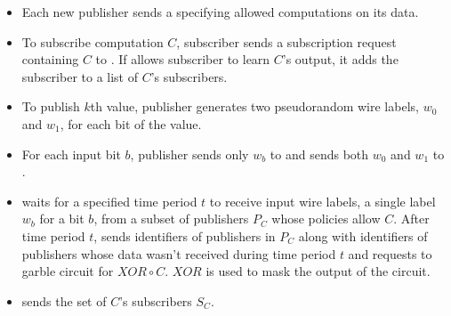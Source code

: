 \begin{figure*}[h]
\begin{mdframed}[style=myframe]

\initialize
\begin{itemize}[leftmargin=18pt,itemsep=4pt,topsep=4pt]
 
	\item Each new publisher sends \broker a \policy specifying allowed
		computations on its data.

\end{itemize}

\subscribe
\begin{itemize}[leftmargin=18pt,itemsep=4pt,topsep=4pt]

	\item To subscribe computation $C$, subscriber sends a subscription request
		containing $C$ to \broker. If \broker allows subscriber to learn $C$'s
		output, it adds the subscriber to a list of $C$'s subscribers. 

\end{itemize}

\publish
\begin{itemize}[leftmargin=18pt,itemsep=4pt,topsep=4pt,after=]
		
	\item To publish $k$th value, publisher generates two pseudorandom wire
		labels, $w_0$ and $w_1$, for each bit of the value. 
		
	\item For each input bit $b$, publisher sends only $w_b$ to \broker and sends
		both $w_0$ and $w_1$ to \garbler.

\end{itemize}

\process
\begin{itemize}[leftmargin=18pt,itemsep=4pt,topsep=4pt]

	\item \broker waits for a specified time period $t$ to receive input wire
		labels, a single label $w_b$ for a bit $b$, from a subset of publishers
		$P_C$ whose policies allow $C$. After time period $t$, \broker sends
		\garbler identifiers of publishers in $P_C$ along with identifiers of
		publishers whose data wasn't received during time period $t$ and requests
		\garbler to garble circuit for $XOR \circ C$. $XOR$ is used to mask the
		output of the circuit.

	\item \broker sends \garbler the set of $C$'s subscribers $S_C$.
		

\end{itemize}
\end{mdframed}
\end{figure*}
